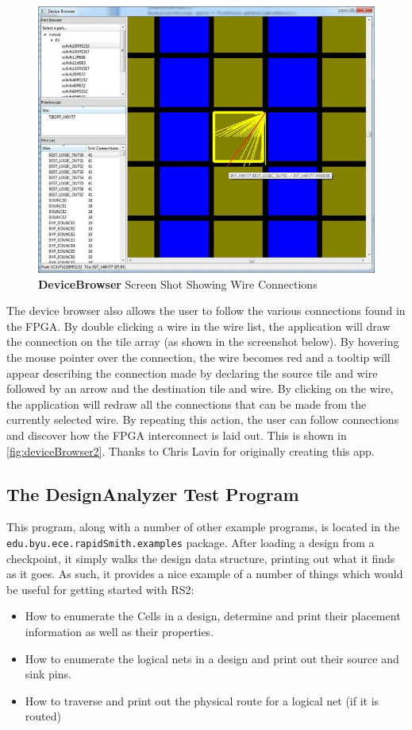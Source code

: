\documentclass[12pt]{article}
\newcommand{\pkg}[1]{{\texttt{#1}}}
\newcommand{\pgm}[1]{{\textbf{#1}}}
\begin{document}
\begin{figure}[htb]
\centering
\includegraphics[width=0.8\columnwidth]{deviceBrowser2}
\caption{\pgm{DeviceBrowser} Screen Shot Showing Wire Connections}
\label{fig:deviceBrowser2}
\end{figure}

The device browser also allows the user to follow the various connections found
in the FPGA.  By double clicking a wire in the wire list, the application will
draw the connection on the tile array (as shown in the screenshot below).  By
hovering the mouse pointer over the connection, the wire becomes red and a
tooltip will appear describing the connection made by declaring the source tile
and wire followed by an arrow and the destination tile and wire.  By
clicking on the wire, the application will redraw all the connections that can
be made from the currently selected wire.  By repeating this action, the user
can follow connections and discover how the FPGA interconnect is laid out.  This
is shown in \autoref{fig:deviceBrowser2}.  Thanks to Chris Lavin for originally
creating this app.

\subsection{The \pgm{DesignAnalyzer} Test Program}
This program, along with a number of other example programs, is located in the\\
\pkg{edu.byu.ece.rapidSmith.examples} package.  After loading a design from a
checkpoint, it simply walks the design data structure, printing out what it
finds as it goes.  As such, it provides a nice example of a number of things
which would be useful for getting started with RS2:
\begin{itemize}
  \item How to enumerate the Cells in a design, determine and print their 
  placement information as well as their properties.
  \item How to enumerate the logical nets in a design and print out their source
  and sink pins. 
  \item How to traverse and print out the physical route for a logical net (if
  it is routed)  
\end{itemize}
\end{document}
